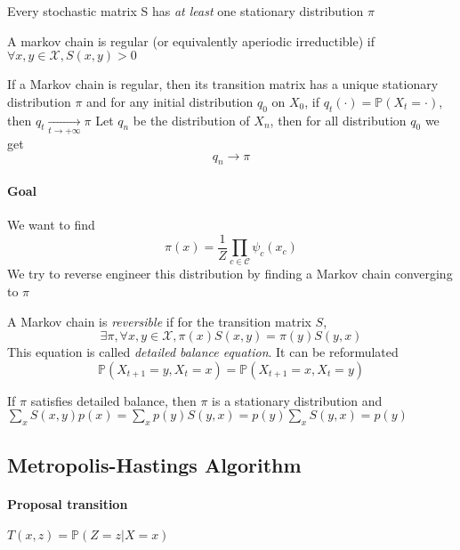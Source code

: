 \documentclass[12pt]{report}
\newcommand{\p}{\mathbb{P}}
\begin{document}
\begin{theorem}
Every stochastic matrix S has \emph{at least} one stationary distribution $\pi$
\end{theorem}

\begin{definition}
  A markov chain is regular (or equivalently aperiodic irreductible) if $\forall x,y \in \mathcal{X}, S(x,y) > 0$
\end{definition}

\begin{proposition}
If a Markov chain is regular, then its transition matrix has a unique stationary distribution $\pi$ and for any initial distribution $q_0$ on $X_0$, if $q_t(\cdot) = \p(X_t = \cdot)$, then $q_t \underset{t\rightarrow + \infty}{\longrightarrow} \pi$
Let $q_n$ be the distribution of $X_n$, then for all distribution $q_0$ we get $$q_n \rightarrow \pi$$
\end{proposition}

\paragraph{Goal}
We want to find $$ \pi(x) = \frac{1}{Z}\prod_{c \in \mathcal{C}} \psi_c(x_c) $$ We try to reverse engineer this distribution by finding a Markov chain converging to $\pi$

\begin{definition}
  A Markov chain is \emph{reversible} if for the transition matrix $S$, $$\exists \pi, \forall x,y \in \mathcal{X}, \pi(x)S(x,y) = \pi(y)S(y,x)$$
  This equation is called \emph{detailed balance equation}. It can be reformulated $$\p(X_{t+1}=y, X_t = x) = \p(X_{t+1}=x, X_t = y)$$
\end{definition}

\begin{proposition}
  If $\pi$ satisfies detailed balance, then $\pi$ is a stationary distribution and
  $\sum_x S(x, y)p(x) = \sum_x p(y)S(y, x) = p(y)\sum_x S(y, x) = p(y)$
\end{proposition}

\subsection{Metropolis-Hastings Algorithm}
\paragraph{Proposal transition}
$T(x,z) = \p(Z=z | X=x)$
\end{document}

